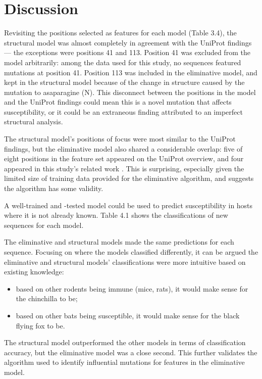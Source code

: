 \section{Discussion}

Revisiting the positions selected as features for each model (Table 3.4), the structural model was almost completely in agreement with the UniProt findings --- the exceptions were positions 41 and 113. Position 41 was excluded from the model arbitrarily: among the data used for this study, no sequences featured mutations at position 41. Position 113 was included in the eliminative model, and kept in the structural model because of the change in structure caused by the mutation to asaparagine (N). This disconnect between the positions in the model and the UniProt findings could mean this is a novel mutation that affects susceptibility, or it could be an extraneous finding attributed to an imperfect structural analysis.

The structural model's positions of focus were most similar to the UniProt findings, but the eliminative model also shared a considerable overlap: five of eight positions in the feature set appeared on the UniProt overview, and four appeared in this study's related work \cite{Li2021,Zhao2020,Luan2020}. This is surprising, especially given the limited size of training data provided for the eliminative algorithm, and suggests the algorithm has some validity.

A well-trained and -tested model could be used to predict susceptibility in hosts where it is not already known. Table 4.1 shows the classifications of new sequences for each model.



The eliminative and structural models made the same predictions for each sequence. Focusing on where the models classified differently, it can be argued the eliminative and structural models' classifications were more intuitive based on existing knowledge:
\begin{itemize}
    \setlength\itemsep{0em}
    \item based on other rodents being immune (mice, rats), it would make sense for the chinchilla to be;
    \item based on other bats being susceptible, it would make sense for the black flying fox to be.
\end{itemize}

The structural model outperformed the other models in terms of classification accuracy, but the eliminative model was a close second. This further validates the algorithm used to identify influential mutations for features in the eliminative model. 

